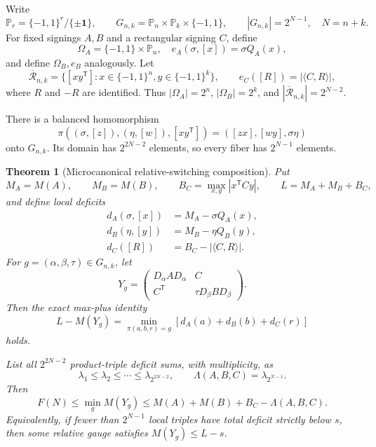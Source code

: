 \documentclass[11pt]{article}
\newtheorem{theorem}{Theorem}
\newcommand{\eps}{\{-1,1\}}
\begin{document}
Write
\[
 \mathbb P_r=\eps^r/\{\pm\mathbf1\},\qquad
 G_{n,k}=\mathbb P_n\times\mathbb P_k\times\eps,
 \qquad |G_{n,k}|=2^{N-1},\quad N=n+k.
\]
For fixed signings $A,B$ and a rectangular signing $C$, define
\[
 \Omega_A=\eps\times\mathbb P_n,
 \quad e_A(\sigma,[x])=\sigma Q_A(x),
\]
and define $\Omega_B,e_B$ analogously.  Let
\[
 \overline{\mathcal R}_{n,k}
 =\{[xy^{\mathsf T}]:x\in\eps^n,y\in\eps^k\},
 \qquad e_C([R])=|\langle C,R\rangle|,
\]
where $R$ and $-R$ are identified.  Thus
$|\Omega_A|=2^n$, $|\Omega_B|=2^k$, and
$|\overline{\mathcal R}_{n,k}|=2^{N-2}$.

There is a balanced homomorphism
\begin{equation}
 \pi((\sigma,[z]),(\eta,[w]),[xy^{\mathsf T}])
 =([zx],[wy],\sigma\eta)
 \label{eq:relative-profile-map}
\end{equation}
onto $G_{n,k}$.  Its domain has $2^{2N-2}$ elements, so every fiber has
$2^{N-1}$ elements.

\begin{theorem}[Microcanonical relative-switching composition]
\label{thm:relative-profile}
Put
\[
 M_A=M(A),\qquad M_B=M(B),\qquad
 B_C=\max_{x,y}|x^{\mathsf T}Cy|,\qquad L=M_A+M_B+B_C,
\]
and define local deficits
\begin{align*}
 d_A(\sigma,[x])&=M_A-\sigma Q_A(x),\\
 d_B(\eta,[y])&=M_B-\eta Q_B(y),\\
 d_C([R])&=B_C-|\langle C,R\rangle|.
\end{align*}
For $g=(\alpha,\beta,\tau)\in G_{n,k}$, let
\[
 Y_g=\begin{pmatrix}
 D_\alpha AD_\alpha&C\\
 C^{\mathsf T}&\tau D_\beta BD_\beta
 \end{pmatrix}.
\]
Then the exact max-plus identity
\begin{equation}
 L-M(Y_g)=
 \min_{\pi(a,b,r)=g}[d_A(a)+d_B(b)+d_C(r)]
 \label{eq:relative-profile-maxplus}
\end{equation}
holds.

List all $2^{2N-2}$ product-triple deficit sums, with multiplicity, as
\[
 \lambda_1\le\lambda_2\le\cdots\le\lambda_{2^{2N-2}},
 \qquad \Lambda(A,B,C)=\lambda_{2^{N-1}}.
\]
Then
\begin{equation}
 F(N)\le\min_gM(Y_g)
 \le M(A)+M(B)+B_C-\Lambda(A,B,C).
 \label{eq:relative-profile-composition}
\end{equation}
Equivalently, if fewer than $2^{N-1}$ local triples have total deficit
strictly below $s$, then some relative gauge satisfies $M(Y_g)\le L-s$.
\end{theorem}
\end{document}
